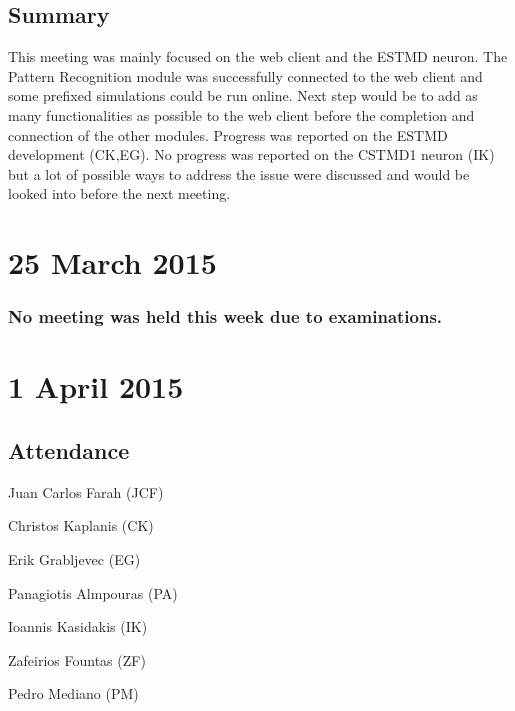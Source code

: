 \documentclass[a4paper,11pt]{article}
\begin{document}
\begin{appendices}
\subsection*{Summary}
This meeting was mainly focused on the web client and the ESTMD neuron. The Pattern Recognition module was successfully connected to the web client and some prefixed simulations could be run online. Next step would be to add as many functionalities as possible to the web client before the completion and connection of the other modules. Progress was reported on the ESTMD development (CK,EG). No progress was reported on the CSTMD1 neuron (IK) but a lot of possible ways to address the issue were discussed and would be looked into before the next meeting.

\maketitle
\section*{25 March 2015}
\subsubsection*{No meeting was held this week due to examinations.}

\maketitle
\section*{1 April 2015}
\subsection*{Attendance}
\begin{compactenum}
\item Juan Carlos Farah (JCF)
\item Christos Kaplanis (CK)
\item Erik Grabljevec (EG)
\item Panagiotis Almpouras (PA)
\item Ioannis Kasidakis (IK)
\item Zafeirios Fountas (ZF)
\item Pedro Mediano (PM)
\end{compactenum}


\end{appendices}
\end{document}
